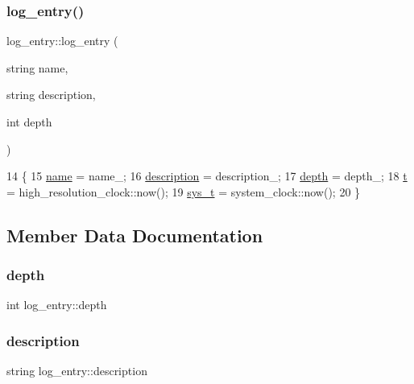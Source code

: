 \subsubsection{\texorpdfstring{log\+\_\+entry()}{log\_entry()}}
{\footnotesize\ttfamily log\+\_\+entry\+::log\+\_\+entry (\begin{DoxyParamCaption}\item[{string}]{name,  }\item[{string}]{description,  }\item[{int}]{depth }\end{DoxyParamCaption})}


\begin{DoxyCode}
14                                                                  \{
15   \hyperlink{classlog__entry_ac65943b778a5978a579d984a6b682def}{name} = name\_;
16   \hyperlink{classlog__entry_a35acb4013a550dd9926c6cccd93300dd}{description} = description\_;
17   \hyperlink{classlog__entry_abfcc98c447997da2eb424a73f5f06da4}{depth} = depth\_;
18   \hyperlink{classlog__entry_a9477b6872dfa3609db1e4e6a97ed5dba}{t} = high\_resolution\_clock::now();
19   \hyperlink{classlog__entry_a2877798c71ba0f0762b821633c8bc517}{sys\_t} = system\_clock::now();
20 \}
\end{DoxyCode}


\subsection{Member Data Documentation}
\mbox{\label{classlog__entry_abfcc98c447997da2eb424a73f5f06da4}} 
\subsubsection{\texorpdfstring{depth}{depth}}
{\footnotesize\ttfamily int log\+\_\+entry\+::depth}

\mbox{\label{classlog__entry_a35acb4013a550dd9926c6cccd93300dd}} 
\subsubsection{\texorpdfstring{description}{description}}
{\footnotesize\ttfamily string log\+\_\+entry\+::description}

